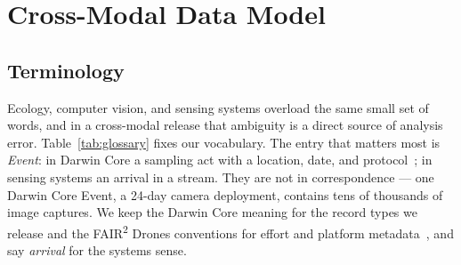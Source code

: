 \documentclass[sigconf]{acmart}
\begin{document}
\section{Cross-Modal Data Model}
\label{sec:model}

\subsection{Terminology}
\label{sec:glossary}

Ecology, computer vision, and sensing systems overload the same small
set of words, and in a cross-modal release that ambiguity is a direct
source of analysis error. Table~\ref{tab:glossary} fixes our vocabulary.
The entry that matters most is \emph{Event}: in Darwin Core a sampling
act with a location, date, and
protocol~\cite{wieczorek2012darwincore,tdwgDarwinCore}; in sensing
systems an arrival in a stream. They are not in correspondence --- one
Darwin Core Event, a 24-day camera deployment, contains tens of
thousands of image captures. We keep the Darwin Core meaning for the
record types we release and the FAIR\textsuperscript{2} Drones
conventions for effort and platform
metadata~\cite{pierrat2025proximal}, and say \emph{arrival} for the
systems sense.
\end{document}
